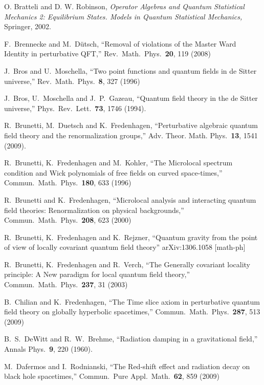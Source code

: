 \documentclass[12pt]{article}
\theoremstyle{plain}
\theoremstyle{definition}
\begin{document}
\begin{thebibliography}{99}
O. Bratteli and D. W. Robinson,
{\em Operator Algebras and Quantum Statistical Mechanics 2: Equilibrium States. Models in Quantum Statistical Mechanics,} Springer, 2002.

F.~Brennecke and M.~D\" utsch,
  ``Removal of violations of the Master Ward Identity in perturbative QFT,''
  Rev.\ Math.\ Phys.\  {\bf 20}, 119 (2008)

 J.~Bros and U.~Moschella,
  ``Two point functions and quantum fields in de Sitter universe,''
  Rev.\ Math.\ Phys.\  {\bf 8}, 327 (1996)


 J.~Bros, U.~Moschella and J.~P.~Gazeau,
  ``Quantum field theory in the de Sitter universe,''
  Phys.\ Rev.\ Lett.\  {\bf 73}, 1746 (1994).

R.~Brunetti, M.~Duetsch and K.~Fredenhagen,
``Perturbative algebraic quantum field theory and the renormalization groups,''
Adv. Theor. Math. Phys.\ {\bf 13}, 1541 (2009).


 R.~Brunetti, K.~Fredenhagen and M.~Kohler,
  ``The Microlocal spectrum condition and Wick polynomials of free fields on curved space-times,''
  Commun.\ Math.\ Phys.\  {\bf 180}, 633 (1996)


 R.~Brunetti and K.~Fredenhagen,
  ``Microlocal analysis and interacting quantum field theories: Renormalization on physical backgrounds,''
  Commun.\ Math.\ Phys.\  {\bf 208}, 623 (2000)
  
  
R.~Brunetti, K.~Fredenhagen and K.~Rejzner,
``Quantum gravity from the point of view of locally covariant quantum field theory''
arXiv:1306.1058 [math-ph]


R.~Brunetti, K.~Fredenhagen and R.~Verch,
  ``The Generally covariant locality principle: A New paradigm for local quantum field theory,''
  Commun.\ Math.\ Phys.\  {\bf 237}, 31 (2003)


B.~Chilian and K.~Fredenhagen,
  ``The Time slice axiom in perturbative quantum field theory on globally hyperbolic spacetimes,''
  Commun.\ Math.\ Phys.\  {\bf 287}, 513 (2009)


 B.~S.~DeWitt and R.~W.~Brehme,
  ``Radiation damping in a gravitational field,''
  Annals Phys.\  {\bf 9}, 220 (1960).

 M.~Dafermos and I.~Rodnianski,
  ``The Red-shift effect and radiation decay on black hole spacetimes,''
  Commun.\ Pure Appl.\ Math.\  {\bf 62}, 859 (2009)



\end{thebibliography}
\end{document}
